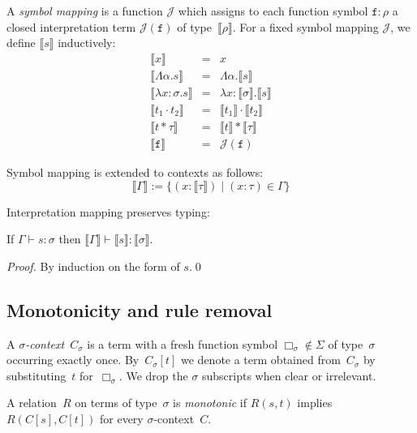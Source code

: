 \documentclass[runningheads,a4paper]{llncs}
\newcommand{\Termmap}{\mathcal{J}}
\newcommand{\typeinterpret}[1]{\llbracket #1 \rrbracket}
\newcommand{\interpret}[1]{\llbracket #1 \rrbracket}
\newcommand{\itp}[1]{\llbracket #1 \rrbracket}
\newcommand{\abs}[2]{\lambda #1.#2}
\newcommand{\tabs}[2]{\Lambda #1.#2}
\newcommand{\app}[2]{#1 \cdot #2}
\newcommand{\tapp}[2]{#1 * #2}
\begin{document}
\begin{definition}\normalfont
  A \emph{symbol mapping} is a function $\Termmap$ which assigns to
  each function symbol $\mathtt{f} : \rho$ a closed interpretation
  term $\Termmap(\mathtt{f})$ of type~$\typeinterpret{\rho}$. For a
  fixed symbol mapping $\Termmap$, we define $\interpret{s}$
  inductively:
  \[
    \begin{array}{rcl}
      \interpret{x} & = & x \\
      \interpret{\tabs{\alpha}{s}} & = & \tabs{\alpha}{\interpret{s}} \\
      \interpret{\abs{x:\sigma}{s}} & = & \abs{x:\typeinterpret{\sigma}}{
                                          \interpret{s}} \\
      \interpret{\app{t_1}{t_2}} &=& \app{\interpret{t_1}}{\interpret{t_2}} \\
      \interpret{\tapp{t}{\tau}} &=& \tapp{\interpret{t}}{\typeinterpret{\tau}} \\
      \interpret{\mathtt{f}} &=& \Termmap(\mathtt{f})
    \end{array}
  \]

  Symbol mapping is extended to contexts as follows:
  \[
    \itp{\Gamma} := \{ (x : \typeinterpret{\tau}) \mid (x : \tau) \in \Gamma \}
  \]
\end{definition}

Interpretation mapping preserves typing:

\begin{lemma}
If $\Gamma \vdash s : \sigma$ then $\itp{\Gamma} \vdash \interpret{s}
: \typeinterpret{\sigma}$.
\end{lemma}

\begin{proof} %
  By induction on the form of $s$.\qed
\end{proof}

\subsection{Monotonicity and rule removal}

\begin{definition}\normalfont
  A \emph{$\sigma$-context}~$C_\sigma$ is a term with a fresh function
  symbol $\Box_\sigma \notin \Sigma$ of type~$\sigma$ occurring
  exactly once. By~$C_\sigma[t]$ we denote a term obtained
  from~$C_\sigma$ by substituting~$t$ for~$\Box_\sigma$. We drop the
  $\sigma$ subscripts when clear or irrelevant.

  A relation~$R$ on terms of type~$\sigma$ is \emph{monotonic} if
  $R(s, t)$ implies $R(C[s], C[t])$ for every $\sigma$-context~$C$.
\end{definition}
\end{document}
